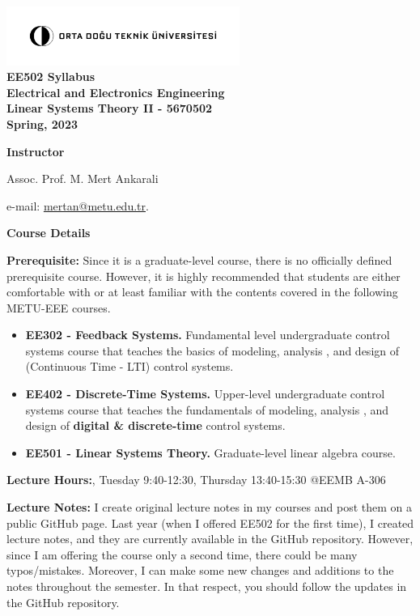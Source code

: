 \documentclass[11pt,oneside]{amsart}
\newcommand{\header}[1]{\bigbreak\textbf{#1}}
\begin{document}
\begin{center}
  \bf
  \includegraphics[width=3in]{metu_logo} \\
  EE502 Syllabus \\
 Electrical and Electronics Engineering \\ 
Linear Systems Theory II - 5670502 \\
Spring, 2023
\end{center}

\header{Instructor} 

\vspace{4pt}

Assoc. Prof. M. Mert Ankarali

e-mail: \url{mertan@metu.edu.tr}.

\header{Course Details}

\vspace{6pt}

\textbf{Prerequisite:} Since it is a graduate-level course, there is no officially defined prerequisite course. However, it is highly recommended that students are either comfortable with or at least familiar with the contents covered in the following METU-EEE courses.


\begin{itemize}
  \item \textbf{EE302 - Feedback Systems.} Fundamental level undergraduate control
    systems course that teaches the basics of modeling, analysis
    , and design of (Continuous Time - LTI) control systems. 
   \item \textbf{EE402 - Discrete-Time Systems.} Upper-level undergraduate control
    systems course that teaches the fundamentals of modeling, analysis
    , and design of \textbf{digital \& discrete-time} control systems. 
   \item \textbf{EE501 - Linear Systems Theory.} Graduate-level linear algebra course.
\end{itemize}

\vspace{9pt}

\textbf{Lecture Hours:}, Tuesday 9:40-12:30, Thursday 13:40-15:30
@EEMB A-306

\vspace{9pt}

\textbf{Lecture Notes:} I create original lecture notes in my courses and post them on a public GitHub page. Last year (when I offered EE502 for the first time), I created lecture notes, and they are currently available in the GitHub repository. However, since I am offering the course only a second time, there could be many typos/mistakes. Moreover, I can make some new changes and additions to the notes throughout the semester. In that respect, you should follow the updates in the GitHub repository. 
\end{document}
